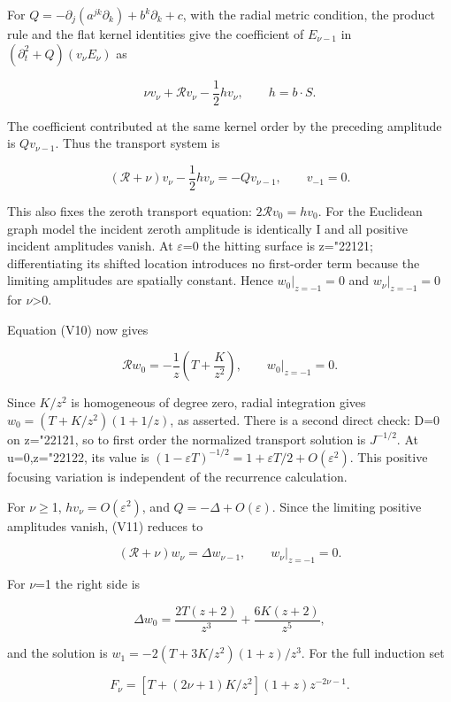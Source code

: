 \documentclass[
  11pt,
]{article}
\begin{document}
For \(Q=-\partial_j(a^{jk}\partial_k)+b^k\partial_k+c\), with the radial
metric condition, the product rule and the flat kernel identities give
the coefficient of \(E_{\nu-1}\) in \((\partial_t^2+Q)(v_\nu E_\nu)\) as

\[
 \nu v_\nu+\mathcal Rv_\nu-\frac12 h v_\nu,
 \qquad h=b\cdot S.
\]

The coefficient contributed at the same kernel order by the preceding
amplitude is \(Qv_{\nu-1}\). Thus the transport system is

\[
 (\mathcal R+\nu)v_\nu-\frac12 h v_\nu=-Qv_{\nu-1},
 \qquad v_{-1}=0.
 \tag{V11}
\]

This also fixes the zeroth transport equation: \(2\mathcal Rv_0=hv_0\).
For the Euclidean graph model the incident zeroth amplitude is
identically I and all positive incident amplitudes vanish. At \ensuremath{\varepsilon}=0 the
hitting surface is z={\ReaderSymbols\char"2212}1; differentiating its shifted location introduces
no first-order term because the limiting amplitudes are spatially
constant. Hence \(w_0|_{z=-1}=0\) and \(w_\nu|_{z=-1}=0\) for
\ensuremath{\nu}\textgreater0.

Equation (V10) now gives

\[
 \mathcal Rw_0=-\frac1z\left(T+\frac K{z^2}\right),\qquad
 w_0|_{z=-1}=0.
\]

Since \(K/z^2\) is homogeneous of degree zero, radial integration gives
\(w_0=(T+K/z^2)(1+1/z)\), as asserted. There is a second direct check:
D=0 on z={\ReaderSymbols\char"2212}1, so to first order the normalized transport solution is
\(J^{-1/2}\). At u=0,z={\ReaderSymbols\char"2212}2, its value is
\((1-\varepsilon T)^{-1/2}=1+\varepsilon T/2+O(\varepsilon^2)\). This
positive focusing variation is independent of the recurrence
calculation.

For \ensuremath{\nu}\ensuremath{\geq}1, \(h v_\nu=O(\varepsilon^2)\), and \(Q=-\Delta+O(\varepsilon)\).
Since the limiting positive amplitudes vanish, (V11) reduces to

\[
 (\mathcal R+\nu)w_\nu=\Delta w_{\nu-1},\qquad
 w_\nu|_{z=-1}=0.
 \tag{V12}
\]

For \ensuremath{\nu}=1 the right side is

\[
 \Delta w_0=\frac{2T(z+2)}{z^3}
              +\frac{6K(z+2)}{z^5},
\]

and the solution is \(w_1=-2(T+3K/z^2)(1+z)/z^3\). For the full
induction set

\[
 F_\nu=\left[T+(2\nu+1)K/z^2\right]
                   (1+z)z^{-2\nu-1}.
\]
\end{document}
